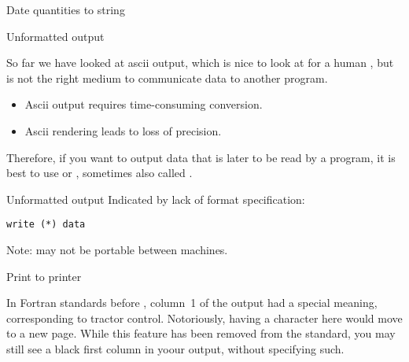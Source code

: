 \begin{block}{Date quantities to string}
  \label{sl:f-date-slash}
\end{block}

 {Unformatted output}
\label{sec:rawdataf}

So far we have looked at ascii output, which is nice to look at for a
human , but is not the right medium to communicate data to another
program.
\begin{itemize}
\item Ascii output requires time-consuming conversion.
\item Ascii rendering leads to loss of precision.
\end{itemize}
Therefore, if you want to output data that is later to be read by a
program, it is best to use  or
, sometimes also called
.

\begin{block}{Unformatted output}
  Indicated by lack of format specification:
\begin{lstlisting}
write (*) data
\end{lstlisting}
  Note: may not be portable between machines.
\end{block}

 {Print to printer}

In Fortran standards before ,
  column~1 of the output had a special meaning,
  corresponding to  tractor control.
  Notoriously, having a character here would
  move to a new page.
  While this feature has been removed from the standard,
  you may still see a black first column in yoour output,
  without specifying such.



